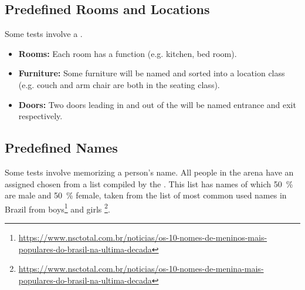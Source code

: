 \subsection{Predefined Rooms and Locations}
\textit{\label{sec:rules:scenario:locations}}
Some tests involve a \PredefinedLocation{}.
\begin{itemize}
	\item \textbf{Rooms:} Each room has a function (e.g. kitchen, bed room).
	
	\item \textbf{Furniture:} Some furniture will be named and sorted into a location class (e.g. couch and arm chair are both in the seating class). 
	
	\item \textbf{Doors:} Two doors leading in and out of the \Arena{} will be named entrance and exit respectively.
\end{itemize}


\subsection{Predefined Names}
\label{sec:rules:scenario:names}
Some tests involve memorizing a person's name. All people in the arena have an assigned \PredefinedName{} chosen from a list compiled by the \TC{}. This list has \NumNames{} names of which \SI{50}{\percent} are male and \SI{50} {\percent} female,
taken from the list of most common used names in Brazil from boys\footnote{\url{https://www.nsctotal.com.br/noticias/os-10-nomes-de-meninos-mais-populares-do-brasil-na-ultima-decada}} and girls \footnote{\url{https://www.nsctotal.com.br/noticias/os-10-nomes-de-menina-mais-populares-do-brasil-na-ultima-decada}}.






